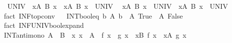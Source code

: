 \begin{isabellebody}
\ \ {\isachardoublequoteopen}{\isacharparenleft}{\kern0pt}UNIV\ {\isacharequal}{\kern0pt}\ {\isacharparenleft}{\kern0pt}{\isasymInter}x{\isasymin}A{\isachardot}{\kern0pt}\ B\ x{\isacharparenright}{\kern0pt}{\isacharparenright}{\kern0pt}\ {\isacharequal}{\kern0pt}\ {\isacharparenleft}{\kern0pt}{\isasymforall}x{\isasymin}A{\isachardot}{\kern0pt}\ B\ x\ {\isacharequal}{\kern0pt}\ UNIV{\isacharparenright}{\kern0pt}{\isachardoublequoteclose}\isanewline
\ \ {\isachardoublequoteopen}{\isacharparenleft}{\kern0pt}{\isacharparenleft}{\kern0pt}{\isasymInter}x{\isasymin}A{\isachardot}{\kern0pt}\ B\ x{\isacharparenright}{\kern0pt}\ {\isacharequal}{\kern0pt}\ UNIV{\isacharparenright}{\kern0pt}\ {\isacharequal}{\kern0pt}\ {\isacharparenleft}{\kern0pt}{\isasymforall}x{\isasymin}A{\isachardot}{\kern0pt}\ B\ x\ {\isacharequal}{\kern0pt}\ UNIV{\isacharparenright}{\kern0pt}{\isachardoublequoteclose}\isanewline
%
\isadelimproof
\ \ %
\endisadelimproof
%
\isatagproof
{}\isamarkupfalse%
\ {\isacharparenleft}{\kern0pt}fact\ INF{\isacharunderscore}{\kern0pt}top{\isacharunderscore}{\kern0pt}conv{\isacharparenright}{\kern0pt}{\isacharplus}{\kern0pt}%
\endisatagproof
{\isafoldproof}%
%
\isadelimproof
%
\endisadelimproof
\ \isanewline
\isanewline
{}\isamarkupfalse%
\ INT{\isacharunderscore}{\kern0pt}bool{\isacharunderscore}{\kern0pt}eq{\isacharcolon}{\kern0pt}\ {\isachardoublequoteopen}{\isacharparenleft}{\kern0pt}{\isasymInter}b{\isachardot}{\kern0pt}\ A\ b{\isacharparenright}{\kern0pt}\ {\isacharequal}{\kern0pt}\ A\ True\ {\isasyminter}\ A\ False{\isachardoublequoteclose}\isanewline
%
\isadelimproof
\ \ %
\endisadelimproof
%
\isatagproof
{}\isamarkupfalse%
\ {\isacharparenleft}{\kern0pt}fact\ INF{\isacharunderscore}{\kern0pt}UNIV{\isacharunderscore}{\kern0pt}bool{\isacharunderscore}{\kern0pt}expand{\isacharparenright}{\kern0pt}%
\endisatagproof
{\isafoldproof}%
%
\isadelimproof
\isanewline
%
\endisadelimproof
\isanewline
{}\isamarkupfalse%
\ INT{\isacharunderscore}{\kern0pt}anti{\isacharunderscore}{\kern0pt}mono{\isacharcolon}{\kern0pt}\ {\isachardoublequoteopen}A\ {\isasymsubseteq}\ B\ {\isasymLongrightarrow}\ {\isacharparenleft}{\kern0pt}{\isasymAnd}x{\isachardot}{\kern0pt}\ x\ {\isasymin}\ A\ {\isasymLongrightarrow}\ f\ x\ {\isasymsubseteq}\ g\ x{\isacharparenright}{\kern0pt}\ {\isasymLongrightarrow}\ {\isacharparenleft}{\kern0pt}{\isasymInter}x{\isasymin}B{\isachardot}{\kern0pt}\ f\ x{\isacharparenright}{\kern0pt}\ {\isasymsubseteq}\ {\isacharparenleft}{\kern0pt}{\isasymInter}x{\isasymin}A{\isachardot}{\kern0pt}\ g\ x{\isacharparenright}{\kern0pt}{\isachardoublequoteclose}\isanewline

\end{isabellebody}
